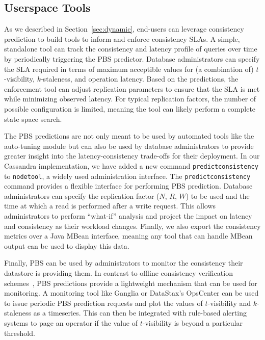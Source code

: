 \subsection{Userspace Tools}

As we described in Section~\ref{sec:dynamic}, end-users can leverage
consistency prediction to build tools to inform and enforce
consistency SLAs. A simple, standalone tool can track the consistency
and latency profile of queries over time by periodically triggering
the PBS predictor. Database administrators can specify the SLA
required in terms of maximum acceptible values for (a combination of)
$t$-visibility, $k$-staleness, and operation latency. Based on the
predictions, the enforcement tool can adjust replication parameters to
ensure that the SLA is met while minimizing observed latency. For
typical replication factors, the number of possible configuration is
limited, meaning the tool can likely perform a complete state space
search.

The PBS predictions are not only meant to be used by automated tools
like the auto-tuning module but can also be used by database
administrators to provide greater insight into the latency-consistency
trade-offs for their deployment. In our Cassandra implementation, we
have added a new command \texttt{predictconsistency} to
\texttt{nodetool}, a widely used administration interface.  The
\texttt{predictconsistency} command provides a flexible interface for
performing PBS prediction. Database administrators can specify the
replication factor ($N$, $R$, $W$) to be used and the time at which a
read is performed after a write request. This allows administrators to
perform ``what-if'' analysis and project the impact on latency and
consistency as their workload changes.  Finally, we also export the
consistency metrics over a Java MBean interface, meaning any tool that
can handle MBean output can be used to display this data.


Finally, PBS can be used by administrators to monitor the consistency
their datastore is providing them. In contrast to offline consistency
verification schemes~\cite{podc-hpl}, PBS predictions provide a
lightweight mechanism that can be used for monitoring. A monitoring
tool like Ganglia or DataStax's OpsCenter can be used to issue
periodic PBS prediction requests and plot the values of $t$-visibility
and $k$-staleness as a timeseries. This can then be integrated with
rule-based alerting systems to page an operator if the value of
$t$-visibility is beyond a particular threshold.
